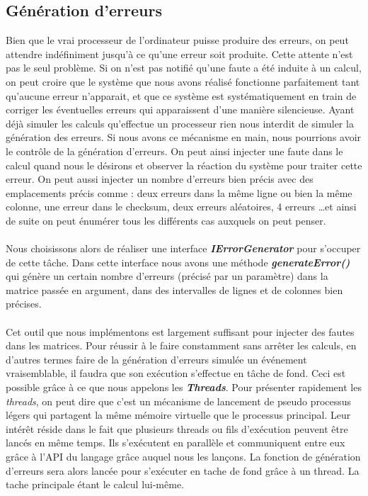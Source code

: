 \documentclass[a4paper, 10pt]{report}
\begin{document}
\subsection{Génération d'erreurs}
Bien que le vrai processeur de l’ordinateur puisse produire des erreurs, on peut attendre indéfiniment jusqu'à ce 
qu’une erreur soit produite. Cette attente n’est pas le seul problème. Si on n’est pas notifié qu’une faute a été 
induite à un calcul, on peut croire que le système que nous avons réalisé fonctionne parfaitement tant qu’aucune 
erreur n’apparait, et que ce système est systématiquement en train de corriger les éventuelles erreurs qui apparaissent 
d’une manière silencieuse. Ayant déjà simuler les calculs qu’effectue un processeur rien nous interdit de simuler la 
génération des erreurs. Si nous avons ce mécanisme en main, nous pourrions avoir le contrôle de la génération d’erreurs. 
On peut ainsi injecter une faute dans le calcul quand nous le désirons et observer la réaction du système pour traiter 
cette erreur. On peut aussi injecter un nombre d’erreurs bien précis avec des emplacements précis comme : deux erreurs 
dans la même ligne ou bien la même colonne, une erreur dans le checksum, deux erreurs aléatoires, 4 erreurs \ldots et ainsi 
de suite on peut énumérer tous les différents cas auxquels on peut penser.
\paragraph*{}
Nous choisissons alors de réaliser une interface \textbf{\textit{IErrorGenerator}} pour s’occuper de cette tâche. 
Dans cette interface nous avons une méthode \textbf{\textit{generateError()}} qui génère un certain nombre d’erreurs 
(précisé par un paramètre) dans la matrice passée en argument, dans des intervalles de lignes et de colonnes bien précises.
\paragraph*{}
Cet outil que nous implémentons est largement suffisant pour injecter des fautes dans les matrices. Pour réussir à le 
faire constamment sans arrêter les calculs, en d’autres termes faire de la génération d’erreurs simulée un événement 
vraisemblable, il faudra que son exécution s’effectue en tâche de fond.
\newline
Ceci est possible grâce à ce que nous appelons les \textbf{\textit{Threads}}. Pour présenter rapidement les \textit{threads}, 
on peut dire que c’est un mécanisme de lancement de pseudo processus légers qui partagent la même mémoire virtuelle que 
le processus principal. Leur intérêt réside dans le fait que plusieurs threads ou fils d’exécution peuvent être lancés en 
même temps. Ils s’exécutent en parallèle et communiquent entre eux grâce à l’API du langage grâce auquel nous les lançons.
La fonction de génération d’erreurs sera alors lancée pour s’exécuter en tache de fond grâce à un thread. La tache principale 
étant le calcul lui-même.
\end{document}
